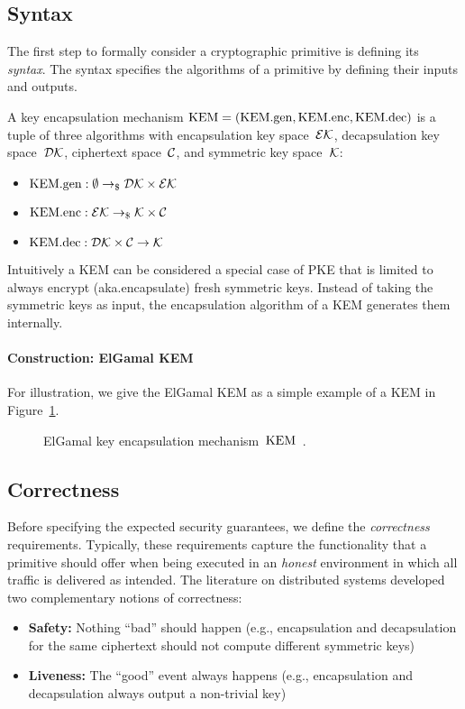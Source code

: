 \documentclass[a4paper,orivec]{llncs}
\begin{document}
\subsection{Syntax}
The first step to formally consider a cryptographic primitive is defining its \emph{syntax}.
The syntax specifies the algorithms of a primitive by defining their inputs and outputs.

A key encapsulation mechanism $\mathrm{KEM}=(\mathrm{KEM}.\mathrm{gen},\mathrm{KEM}.\mathrm{enc},\mathrm{KEM}.\mathrm{dec})$ is a tuple of three algorithms with encapsulation key space~$\mathcal{EK}$, decapsulation key space~$\mathcal{DK}$, ciphertext space~$\mathcal{C}$, and symmetric key space~$\mathcal{K}$:
\begin{itemize}
    \item $\mathrm{KEM}.\mathrm{gen}: \emptyset \to_\$ \mathcal{DK}\times\mathcal{EK}$
    \item $\mathrm{KEM}.\mathrm{enc}: \mathcal{EK} \to_\$ \mathcal{K}\times\mathcal{C}$
    \item $\mathrm{KEM}.\mathrm{dec}: \mathcal{DK}\times\mathcal{C} \to \mathcal{K}$
\end{itemize}

Intuitively a KEM can be considered a special case of PKE that is limited to always encrypt (aka.\@ encapsulate) fresh symmetric keys.
Instead of taking the symmetric keys as input, the encapsulation algorithm of a KEM generates them internally.

\paragraph{Construction: ElGamal KEM}
For illustration, we give the ElGamal KEM as a simple example of a KEM in Figure~\ref{fig:kem:const:elgamal}.

\begin{figure}[!ht]
    \centering
    \nicoresetlinenr%
    \fbox{%
        \scalebox{\codescalefactor}{%
        }%
    }
    \caption{%
        ElGamal key encapsulation mechanism~$\mathrm{KEM}$~\cite{ElGamal85}.
    }
    \label{fig:kem:const:elgamal}
\end{figure}

\subsection{Correctness}
Before specifying the expected security guarantees, we define the \emph{correctness} requirements.
Typically, these requirements capture the functionality that a primitive should offer when being executed in an \emph{honest} environment in which all traffic is delivered as intended.
The literature on distributed systems developed two complementary notions of correctness:
\begin{itemize}
    \item \textbf{Safety:} Nothing ``bad'' should happen (e.g., encapsulation and decapsulation for the same ciphertext should not compute different symmetric keys)
    \item \textbf{Liveness:} The ``good'' event always happens (e.g., encapsulation and decapsulation always output a non-trivial key)
\end{itemize}
\end{document}
